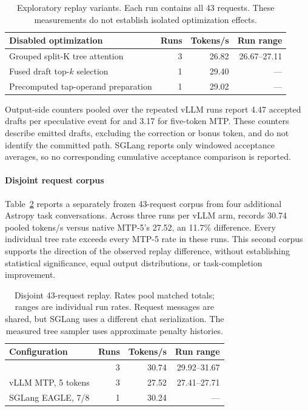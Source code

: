 \begin{table}[t]
\caption{Exploratory replay variants. Each run contains all 43 requests. These measurements do not establish isolated optimization effects.}
\label{tab:replay-variants}
\centering\small
\setlength{\tabcolsep}{3pt}
\begin{tabular}{@{}lrrr@{}}
\toprule
Disabled optimization & Runs & Tokens/s & Run range \\
\midrule
Grouped split-K tree attention & 3 & 26.82 & 26.67--27.11 \\
Fused draft top-$k$ selection & 1 & 29.40 & --- \\
Precomputed tap-operand preparation & 1 & 29.02 & --- \\
\bottomrule
\end{tabular}
\end{table}



Output-side counters pooled over the repeated vLLM runs report 4.47 accepted drafts per speculative event for \sys{} and 3.17 for five-token MTP. These counters describe emitted drafts, excluding the correction or bonus token, and do not identify the committed path. SGLang reports only windowed acceptance averages, so no corresponding cumulative acceptance comparison is reported.

\paragraph{Disjoint request corpus}
Table~\ref{tab:disjoint-replay} reports a separately frozen 43-request corpus from four additional Astropy task conversations. Across three runs per vLLM arm, \sys{} records 30.74 pooled tokens/s versus native MTP-5's 27.52, an 11.7\% difference. Every individual tree rate exceeds every MTP-5 rate in these runs. This second corpus supports the direction of the observed replay difference, without establishing statistical significance, equal output distributions, or task-completion improvement.

\begin{table}[t]
\caption{Disjoint 43-request replay. Rates pool matched totals; ranges are individual run rates. Request messages are shared, but SGLang uses a different chat serialization. The measured tree sampler uses approximate penalty histories.}
\label{tab:disjoint-replay}
\centering\small
\begin{tabular}{@{}lrrr@{}}
\toprule
Configuration & Runs & Tokens/s & Run range \\
\midrule
\sys{} & 3 & 30.74 & 29.92--31.67 \\
vLLM MTP, 5 tokens & 3 & 27.52 & 27.41--27.71 \\
SGLang EAGLE, 7/8 & 1 & 30.24 & --- \\
\bottomrule
\end{tabular}
\end{table}


